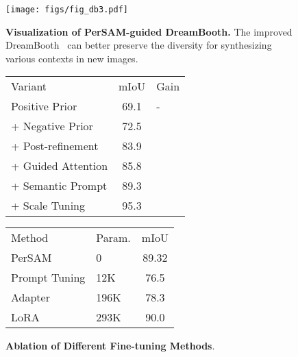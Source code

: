 \documentclass{article} \usepackage{iclr2024_conference,times}
\makeatletter
\newcommand\tabcaption{\def\@captype{table}\caption}
\makeatother
\begin{document}
\begin{figure*}[t]
  \centering
  \vspace{-0.2cm}
\texttt{[image: figs/fig\_db3.pdf]}
   \caption{\textbf{Visualization of PerSAM-guided DreamBooth.} The improved DreamBooth~\citep{ruiz2022dreambooth} can better preserve the diversity for synthesizing various contexts in new images.}
    \label{fig_db3}
\end{figure*}

\begin{figure*}
\begin{minipage}[t!]{0.34\linewidth}
\centering
 \small
\tabcaption{\textbf{Ablation of Main Components} in our proposed method.}
\label{t4}
\begin{adjustbox}{width=\linewidth}
\centering
	\begin{tabular}{lcl}
	\toprule
		Variant &mIoU &Gain\\
		\cmidrule(lr){1-1} \cmidrule(lr){2-2} \cmidrule(lr){3-3}
      Positive Prior &69.1 &- \\
      \cmidrule(lr){1-3}
      + Negative Prior &72.5 &\color{blue}{+3.4}  \\
      + Post-refinement &83.9 &\color{blue}{+11.4} \\
      + Guided Attention &85.8 &\color{blue}{+1.9} \\
      + Semantic Prompt &89.3 &\color{blue}{+3.5} \\
      \cmidrule(lr){1-3}
      + Scale Tuning &95.3 &\color{blue}{+6.0} \\
	  \bottomrule
	\end{tabular}
\end{adjustbox}
\end{minipage}
\hspace{0.2cm}
\begin{minipage}[t!]{0.325\linewidth}
\centering
 \small
\tabcaption{\textbf{Ablation of Different Fine-tuning Methods}.}
\label{t5}
\begin{adjustbox}{width=\linewidth}
\centering
	\begin{tabular}{llc}
	\toprule
		Method &Param. &mIoU \\
		\cmidrule(lr){1-1} \cmidrule(lr){2-2} \cmidrule(lr){3-3} 
      PerSAM &0 &89.32  \\
      \cmidrule(lr){1-3}
      Prompt Tuning  &12K &76.5\\
      Adapter  &196K &78.3 \\
      LoRA & 293K & 90.0 \\

\end{tabular}
\end{adjustbox}
\end{minipage}
\end{figure*}
\end{document}

